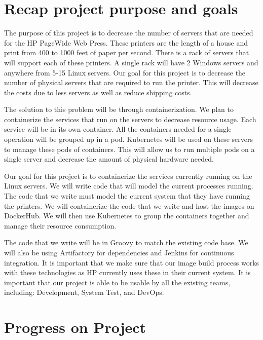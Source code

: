 \documentclass[onecolumn, draftclsnofoot,10pt, compsoc]{IEEEtran}
\begin{document}



\section{Recap project purpose and goals}
The purpose of this project is to decrease the number of servers that are needed for the HP PageWide Web Press. These printers are the length of a house and print from 400 to 1000 feet of paper per second. There is a rack of servers that will support each of these printers. A single rack will have 2 Windows servers and anywhere from 5-15 Linux servers. Our goal for this project is to decrease the number of physical servers that are required to run the printer. This will decrease the costs due to less servers as well as reduce shipping costs. 

The solution to this problem will be through containerization. We plan to containerize the services that run on the servers to decrease resource usage. Each service will be in its own container. All the containers needed for a single operation will be grouped up in a pod. Kubernetes will be used on these servers to manage these pods of containers. This will allow us to run multiple pods on a single server and decrease the amount of physical hardware needed. 

Our goal for this project is to containerize the services currently running on the Linux servers. We will write code that will model the current processes running. The code that we write must model the current system that they have running the printers. We will containerize the code that we write and host the images on DockerHub. We will then use Kubernetes to group the containers together and manage their resource consumption. 

The code that we write will be in Groovy to match the existing code base. We will also be using Artifactory for dependencies and Jenkins for continuous integration. It is important that we make sure that our image build process works with these technologies as HP currently uses these in their current system. It is important that our project is able to be usable by all the existing teams, including: Development, System Test, and DevOps.






\section{Progress on Project}
\end{document}
